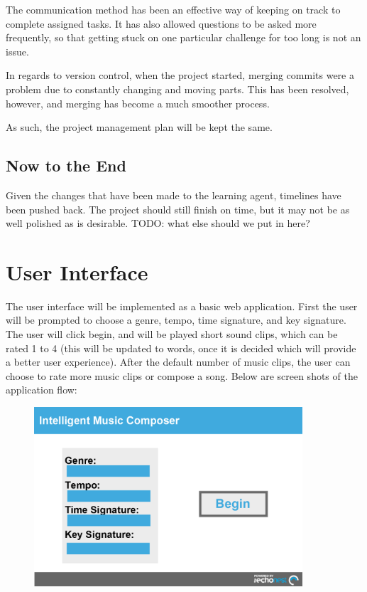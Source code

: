 \documentclass{article}
\begin{document}
The communication method has been an effective way of keeping on track to complete assigned tasks. 
It has also allowed questions to be asked more frequently, so that getting stuck on one particular 
challenge for too long is not an issue.

In regards to version control, when the project started, merging commits were a problem due to constantly 
changing and moving parts. This has been resolved, however, and merging has become a much smoother process.

As such, the project management plan will be kept the same.

\subsection{Now to the End}
Given the changes that have been made to the learning agent, timelines have been pushed back. The project
should still finish on time, but it may not be as well polished as is desirable.
\Large{TODO: what else should we put in here?}

\section{User Interface}
The user interface will be implemented as a basic web application. First the user will be prompted 
to choose a genre, tempo, time signature, and key signature.  The user will click begin, and will 
be played short sound clips, which can be rated 1 to 4 (this will be updated to words, once it is 
decided which will provide a better user experience).  After the default number of music clips, the 
user can choose to rate more music clips or compose a song.  
Below are screen shots of the application flow:

\begin{figure}[H]
\centerline{\includegraphics[width=10cm]{begin.png}}
\end{figure}
\end{document}
